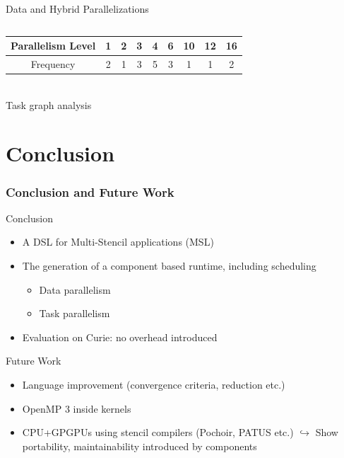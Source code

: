 \documentclass{beamer}
\begin{document}
\begin{frame}
\begin{columns}
\begin{column}{6cm}
\begin{center}
\vspace{-1em}\small  Data and Hybrid Parallelizations
\end{center}
\end{column}
\end{columns}
\bigskip
\begin{center}
{\small
  \begin{tabular}{|c|c|c|c|c|c|c|c|c|}
    \hline 
   Parallelism Level & 1 & 2 & 3 & 4 & 6 & 10 & 12 & 16\\
   \hline
   Frequency & 2 & 1 & 3 & 5 & 3 & 1 & 1 & 2\\
   \hline
 \end{tabular}
 \\
 Task graph analysis
}
\end{center}
\end{frame}


\section{Conclusion}
\begin{frame}
\frametitle{Conclusion and Future Work}
\begin{block}{Conclusion}
\begin{itemize}
\item A DSL for Multi-Stencil applications (MSL)
\item The generation of a component based runtime, including scheduling
\begin{itemize}
\item Data parallelism
\item Task parallelism
\end{itemize}
\item Evaluation on Curie: no overhead introduced 
\end{itemize}
\end{block}

\begin{block}{Future Work}
  \begin{itemize}
  \item Language improvement (convergence criteria, reduction etc.)
  \item OpenMP 3 inside kernels
  \item CPU+GPGPUs using stencil compilers (Pochoir, PATUS etc.)
$\hookrightarrow$ Show portability, maintainability introduced by components

  \end{itemize}
\end{block}
\end{frame}
\end{document}
